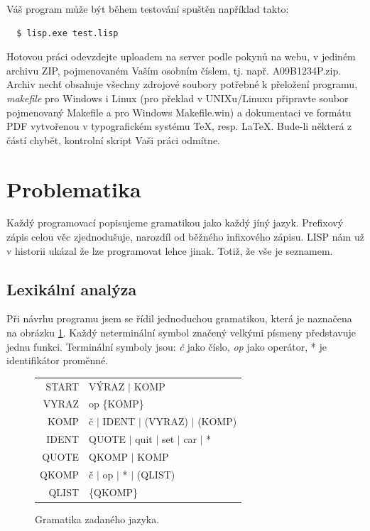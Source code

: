 \documentclass[a4paper, 12pt]{article}
\begin{document}
Váš program může být během testování spuštěn například takto:
\begin{verbatim}
  $ lisp.exe test.lisp
\end{verbatim}

Hotovou práci odevzdejte uploadem na server podle pokynů na webu,
v jediném archivu ZIP, pojmenovaném Vaším osobním číslem, tj. např.
\textsf{A09B1234P.zip}. Archiv nechť obsahuje všechny zdrojové
soubory potřebné k přeložení programu, \emph{makefile} pro Windows
i Linux (pro překlad v UNIXu/Linuxu připravte soubor pojmenovaný
\textsf{Makefile} a pro Windows \textsf{Makefile.win}) a dokumentaci
ve formátu PDF vytvořenou v typografickém systému \TeX{}, resp.
\LaTeX{}. Bude-li některá z částí chybět, kontrolní skript Vaši práci
odmítne.

\section{Problematika}
Každý programovací popisujeme gramatikou jako každý jíný jazyk.
Prefixový zápis celou věc zjednodušuje, narozdíl od běžného infixového
zápisu. LISP nám už v historii ukázal že lze programovat lehce jinak.
Totiž, že vše je seznamem.

\subsection{Lexikální analýza}
Při návrhu programu jsem se řídil jednoduchou gramatikou, která je
naznačena na obrázku \ref{fig:gram}. Každý neterminální symbol značený
velkými písmeny představuje jednu funkci. Terminální symboly jsou:
\emph{č} jako číslo, \emph{op} jako operátor, * je identifikátor proměnné.

\begin{figure}
\centering
\begin{tabular}{r@{$\quad\longrightarrow\quad$}l}
START & VÝRAZ $|$ KOMP\\
VYRAZ & op \{KOMP\}\\
KOMP & č $|$ IDENT $|$ (VYRAZ) $|$ (KOMP)\\
IDENT & QUOTE $|$ quit $|$ set $|$ car $|$ *\\[1ex]
QUOTE & QKOMP $|$ KOMP\\
QKOMP & č $|$ op $|$ * $|$ (QLIST)\\
QLIST & \{QKOMP\}

\end{tabular}

\caption{Gramatika zadaného jazyka.}
\label{fig:gram}
\end{figure}
\end{document}
